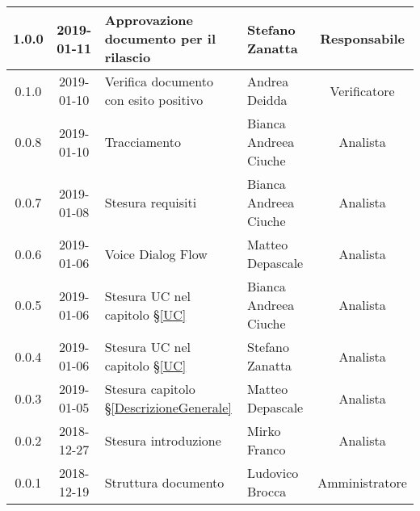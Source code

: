 \begin{center}
\begin{tabularx}{\textwidth}{|c|c|X|X|c|}
			\hline
			1.0.0 & 2019-01-11 & Approvazione documento per il rilascio& Stefano Zanatta & Responsabile\\
			\hline
			0.1.0 & 2019-01-10 & Verifica documento con esito positivo& Andrea Deidda & Verificatore\\
			\hline
			0.0.8 & 2019-01-10 & Tracciamento& Bianca Andreea Ciuche& Analista\\
			\hline
			0.0.7 & 2019-01-08 & Stesura requisiti & Bianca Andreea Ciuche& Analista\\
			\hline
			0.0.6 & 2019-01-06 & Voice Dialog Flow & Matteo Depascale & Analista\\
			\hline
			0.0.5 & 2019-01-06 & Stesura UC nel capitolo \S\ref{UC}& Bianca Andreea Ciuche & Analista\\
			\hline
			0.0.4 & 2019-01-06 & Stesura UC nel capitolo \S\ref{UC}& Stefano Zanatta & Analista\\
			\hline
			0.0.3 & 2019-01-05 & Stesura capitolo \S\ref{DescrizioneGenerale}& Matteo Depascale & Analista\\
			\hline
			0.0.2 & 2018-12-27 & Stesura introduzione & Mirko Franco & Analista\\
			\hline
			0.0.1 & 2018-12-19 & Struttura documento & Ludovico Brocca & Amministratore\\
			\hline
		\end{tabularx}
	\end{center}
\newpage